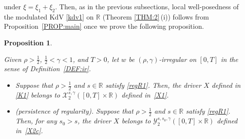 \documentclass[letterpaper, 11pt,  reqno]{amsart}
\newtheorem{proposition}[theorem]{Proposition}
\newcommand{\1}{\hspace{0.5mm}\text{I}\hspace{0.5mm}}
\newcommand{\noi}{\noindent}
\newcommand{\R}{\mathbb{R}}
\newcommand{\g}{\gamma}
\newcommand{\cX}{\mathcal{X}}
\newcommand{\cY}{\mathcal{Y}}
\numberwithin{equation}{section}
\numberwithin{theorem}{section}
\begin{document}
\noi
 under $\xi = \xi_1+ \xi_2$.
Then, as in the previous subsections, 
local well-posedness of the modulated KdV \eqref{kdv1}
on $\R$
(Theorem \ref{THM:2}\,(i)) follows
from Proposition~\ref{PROP:main}
once we prove
the following proposition.



\begin{proposition}
\label{PROP:KR1}


Given $\rho > \frac 12$,  $\frac 12 < \g < 1$, and $T> 0$, 
let  $w$ be $(\rho,\g)$-irregular on $[0, T]$ in the sense of Definition~\ref{DEF:ir}.

\smallskip

\begin{itemize}
\item[(i)]
Suppose that $\rho >  \frac 12$ and $s \in \R$
satisfy 
\eqref{regR1}.
Then, 
the driver $X$ defined in \eqref{K1}
belongs to $ \cX^{s, \g}_2([0, T]\times \R)$
defined in~\eqref{X1}.

\smallskip
\item[(ii)] \textup{(persistence of regularity).}
Suppose that $\rho >  \frac 12$ and $s \in \R$
satisfy 
\eqref{regR1}.
Then, 
for any $s_0 > s$, 
the driver $X$ 
belongs to 
$\cY^{s, s_0, \g}_{2}([0, T]\times \R)$
defined in~\eqref{X2c}.




\end{itemize}






\end{proposition}
\end{document}
